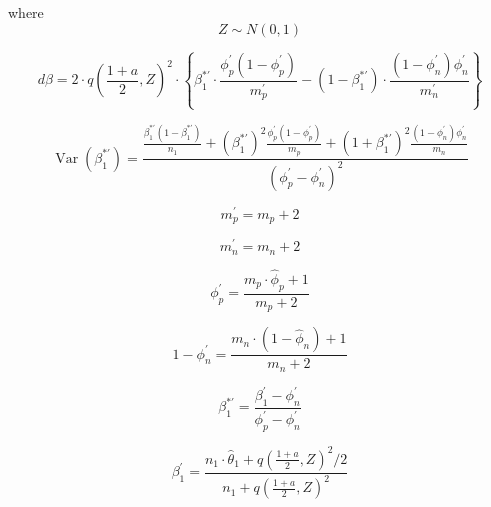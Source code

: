 \documentclass[AMA,STIX1COL]{WileyNJD-v2}
\DeclareMathOperator{\Var}{Var}
\begin{document}
where
\begin{equation}
   Z \sim N(0,1) 
\end{equation}

\begin{equation}
    d\beta = 2 \cdot q\left( \frac{1 + a}{2}, Z \right)^2 \cdot\left\{ \beta_1^{*\prime} \cdot \frac{\phi_p^\prime (1 - \phi_p^\prime)}{m_p^\prime} - (1 - \beta_1^{*\prime}) \cdot \frac{(1 - \phi_n^\prime) \phi_n^\prime}{m_n^\prime}  \right\}
\end{equation}

\begin{equation}
    \Var(\beta_1^{*\prime}) = \frac{ \frac{\beta_1^{*\prime}(1 - \beta_1^{*\prime})}{n_1} + \left(\beta_1^{*\prime}\right)^2 \frac{\phi_p^\prime (1 - \phi_p^\prime)}{m_p} + \left(1 + \beta_1^{*\prime}\right)^2 \frac{(1 - \phi_n^\prime) \phi_n^\prime}{ m_n}}{(\phi_p^\prime - \phi_n^\prime)^2}
\end{equation}

\begin{equation}
    m_p^\prime = m_p +2
\end{equation}

\begin{equation}
    m_n^\prime = m_n + 2
\end{equation}

\begin{equation}
    \phi_p^\prime = \frac{m_p \cdot \hat{\phi}_p + 1}{m_p + 2}
\end{equation}

\begin{equation}
   1 - \phi_n^\prime = \frac{m_n \cdot (1 - \hat{\phi}_n) + 1}{m_n + 2} 
\end{equation}

\begin{equation}
   \beta_1^{*\prime} = \frac{\beta_1^\prime - \phi_n^\prime}{\phi_p^\prime - \phi_n^\prime} 
\end{equation}

\begin{equation}
    \beta_1^\prime = \frac{n_1 \cdot \hat{\theta}_1 + q\left( \frac{1 + a}{2}, Z \right)^2 / 2}{n_1 + q\left( \frac{1 + a}{2}, Z \right)^2}
\end{equation}
\end{document}
